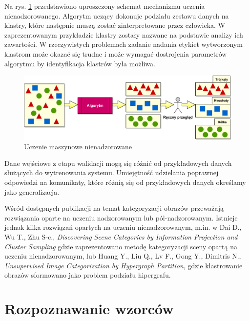 Na rys. \ref{fig:unsupervised-learning} przedstawiono uproszczony schemat mechanizmu uczenia nienadzorowanego. Algorytm uczący dokonuje podziału zestawu danych na klastry, które następnie muszą zostać zinterpretowane przez człowieka. W zaprezentowanym przykładzie klastry zostały nazwane na podstawie analizy ich zawartości. W rzeczywistych problemach zadanie nadania etykiet wytworzonym klastrom może okazać się trudne i może wymagać dostrojenia parametrów algorytmu by identyfikacja klastrów była możliwa.

\begin{figure}[h]
	\centering
	\includegraphics[scale=0.77]{graphics/01_podstawy_teoretyczne/unsupervised-learning.pdf}
	\caption{Uczenie maszynowe nienadzorowane \cite{CASEY}}
	\label{fig:unsupervised-learning}
\end{figure}

Dane wejściowe z etapu walidacji mogą się różnić od przykładowych danych służących do wytrenowania systemu. Umiejętność udzielania poprawnej odpowiedzi na komunikaty, które różnią się od przykładowych danych określamy jako generalizacja.\cite{BISHOP06}

Wśród dostępnych publikacji na temat kategoryzacji obrazów przeważają rozwiązania oparte na uczeniu nadzorowanym lub pól-nadzorowanym.\cite{MELE06}\cite{CHEN04}\cite{Vitaladevuni13}\cite{LUO11} Istnieje jednak kilka rozwiązań opartych na uczeniu nienadzorowanym, m.in. w  Dai D., Wu T., Zhu S-c., \emph{Discovering Scene Categories by Information Projection and Cluster Sampling}\cite{DAI10} gdzie zaprezentowano metodę kategoryzacji sceny opartą na uczeniu nienadzorowanym, lub Huang Y., Liu Q., Lv F., Gong Y., Dimitris N., \emph{Unsupervised Image Categorization by Hypergraph Partition}\cite{HUANG11}, gdzie klastrowanie obrazów sformowano jako problem podziału hipergrafu.

\section{Rozpoznawanie wzorców}

